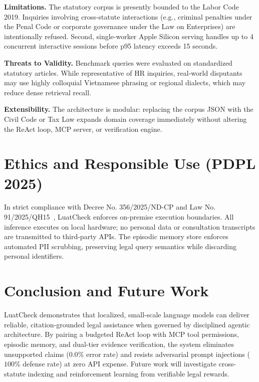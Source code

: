 \documentclass[a4paper,11pt]{article}
\newcommand{\hdr}[1]{\vspace{3pt}\noindent\textbf{#1}}
\begin{document}
\hdr{Limitations.} The statutory corpus is presently bounded to the Labor Code 2019. Inquiries involving cross-statute interactions (e.g., criminal penalties under the Penal Code or corporate governance under the Law on Enterprises) are intentionally refused. Second, single-worker Apple Silicon serving handles up to 4 concurrent interactive sessions before p95 latency exceeds 15 seconds.

\hdr{Threats to Validity.} Benchmark queries were evaluated on standardized statutory articles. While representative of HR inquiries, real-world disputants may use highly colloquial Vietnamese phrasing or regional dialects, which may reduce dense retrieval recall.

\hdr{Extensibility.} The architecture is modular: replacing the corpus JSON with the Civil Code or Tax Law expands domain coverage immediately without altering the ReAct loop, MCP server, or verification engine.

\section{Ethics and Responsible Use (PDPL 2025)}

In strict compliance with Decree No. 356/2025/ND-CP and Law No. 91/2025/QH15~\citep{vietnam2025pdpl,decree3562025}, LuatCheck enforces on-premise execution boundaries. All inference executes on local hardware; no personal data or consultation transcripts are transmitted to third-party APIs. The episodic memory store enforces automated PII scrubbing, preserving legal query semantics while discarding personal identifiers.

\section{Conclusion and Future Work}

LuatCheck demonstrates that localized, small-scale language models can deliver reliable, citation-grounded legal assistance when governed by disciplined agentic architecture. By pairing a budgeted ReAct loop with MCP tool permissions, episodic memory, and dual-tier evidence verification, the system eliminates unsupported claims ($0.0\%$ error rate) and resists adversarial prompt injections ($100\%$ defense rate) at zero API expense. Future work will investigate cross-statute indexing and reinforcement learning from verifiable legal rewards.
\end{document}
